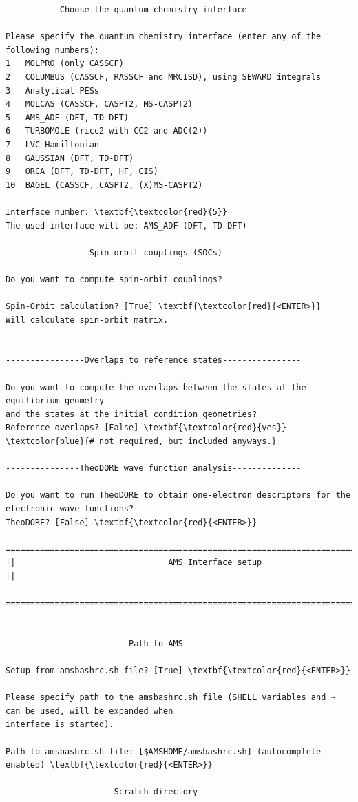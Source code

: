 \documentclass[a4paper,11pt,DIV=15,openany]{scrbook}
\begin{document}
\begin{oframed}
\begin{Verbatim}[commandchars=\\\{\}]
-----------Choose the quantum chemistry interface-----------

Please specify the quantum chemistry interface (enter any of the following numbers):
1	MOLPRO (only CASSCF)
2	COLUMBUS (CASSCF, RASSCF and MRCISD), using SEWARD integrals
3	Analytical PESs
4	MOLCAS (CASSCF, CASPT2, MS-CASPT2)
5	AMS_ADF (DFT, TD-DFT)
6	TURBOMOLE (ricc2 with CC2 and ADC(2))
7	LVC Hamiltonian
8	GAUSSIAN (DFT, TD-DFT)
9	ORCA (DFT, TD-DFT, HF, CIS)
10	BAGEL (CASSCF, CASPT2, (X)MS-CASPT2)

Interface number: \textbf{\textcolor{red}{5}}
The used interface will be: AMS_ADF (DFT, TD-DFT)

-----------------Spin-orbit couplings (SOCs)----------------

Do you want to compute spin-orbit couplings?

Spin-Orbit calculation? [True] \textbf{\textcolor{red}{<ENTER>}} 
Will calculate spin-orbit matrix.


----------------Overlaps to reference states----------------

Do you want to compute the overlaps between the states at the equilibrium geometry 
and the states at the initial condition geometries?
Reference overlaps? [False] \textbf{\textcolor{red}{yes}}    \textcolor{blue}{# not required, but included anyways.}

---------------TheoDORE wave function analysis--------------

Do you want to run TheoDORE to obtain one-electron descriptors for the electronic wave functions?
TheoDORE? [False] \textbf{\textcolor{red}{<ENTER>}} 

================================================================================
||                               AMS Interface setup                              ||
  ================================================================================


-------------------------Path to AMS------------------------

Setup from amsbashrc.sh file? [True] \textbf{\textcolor{red}{<ENTER>}}

Please specify path to the amsbashrc.sh file (SHELL variables and ~ can be used, will be expanded when 
interface is started).

Path to amsbashrc.sh file: [$AMSHOME/amsbashrc.sh] (autocomplete enabled) \textbf{\textcolor{red}{<ENTER>}} 

----------------------Scratch directory---------------------


\end{Verbatim}
\end{oframed}
\end{document}
